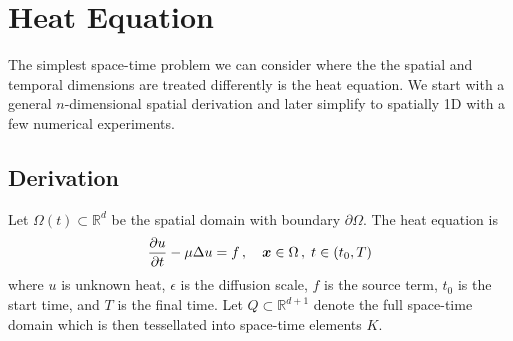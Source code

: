 \documentclass[Proposal.tex]{subfiles}
\begin{document}
%                                          
%                                          
%  
\section{Heat Equation}
The simplest space-time problem we can consider where the the spatial and temporal dimensions are treated differently is the heat equation.
We start with a general $n$-dimensional spatial derivation and later simplify to spatially 1D with a few numerical experiments.

\subsection{Derivation}
Let $\Omega(t)\subset\mathbb{R}^d$ be the spatial domain with boundary $\partial\Omega$.
The heat equation is
\begin{equation}
	\frac{\partial u}{\partial t}-\mu\Delta u=f\,,\quad\boldsymbol x\in\Omega\,,\;t\in(t_0,T)
\end{equation}
where $u$ is unknown heat, $\epsilon$ is the diffusion scale, $f$ is the source term, $t_0$ is the start time, and $T$ is the final time.
Let $Q\subset\mathbb{R}^{d+1}$ denote the full space-time domain which is then tessellated into space-time elements $K$.
\end{document}
